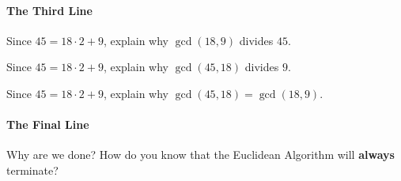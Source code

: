 \paragraph{The Third Line}
\begin{prob}
Since $45 = 18\cdot 2 + 9$, explain why $\gcd(18,9)$ divides $45$.
\end{prob}

\begin{prob}
Since $45 = 18\cdot 2 + 9$, explain why $\gcd(45,18)$ divides $9$.
\end{prob}

\begin{prob}
Since $45 = 18\cdot 2 + 9$, explain why $\gcd(45,18) = \gcd(18,9)$.
\end{prob}


\paragraph{The Final Line}

\begin{prob}
Why are we done? How do you know that the Euclidean Algorithm
will \textbf{always} terminate?
\end{prob}

